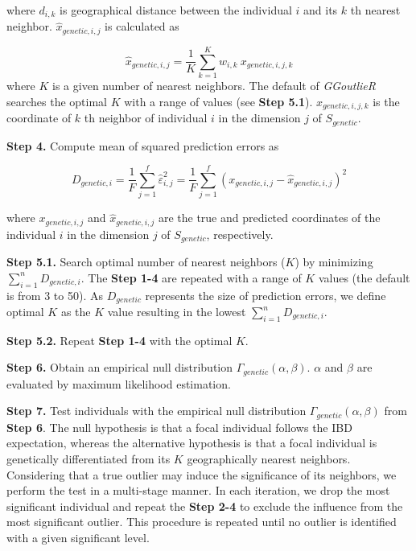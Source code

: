 \documentclass[11pt]{article}
\begin{document}
where $d_{i,k}$ is geographical distance between the individual $i$ and its $k$ th nearest neighbor.
$\hat{x}_{genetic,i,j}$ is calculated as

\begin{equation} \label{wknn_eq1}
\hat{x}_{genetic,i,j}=\frac{1}{K}\sum_{k=1}^{K}w_{i,k}\ x_{genetic,i,j,k}
\end{equation}
where $K$ is a given number of nearest neighbors. 
The default of \textit{GGoutlieR} searches the optimal $K$ with a range of values (see \textbf{Step 5.1}).
$x_{genetic,i,j,k}$ is the coordinate of $k$ th neighbor of individual $i$ in the dimension $j$ of $S_{genetic}$.

\textbf{Step 4.} Compute mean of squared prediction errors as

\begin{equation} \label{Dg_eq}
D_{genetic, i}=\frac{1}{F}\sum_{j=1}^{f} \hat{\varepsilon}_{i,j}^2 =\frac{1}{F}\sum_{j=1}^{f} (x_{genetic,i,j} - \hat{x}_{genetic,i,j})^2
\end{equation}

where $x_{genetic,i,j}$ and $\hat{x}_{genetic,i,j}$ are the true and predicted coordinates of the individual $i$ in the dimension $j$ of $S_{genetic}$, respectively.

\textbf{Step 5.1.} Search optimal number of nearest neighbors ($K$) by minimizing $\sum_{i=1}^{n}D_{genetic,i}$. 
The \textbf{Step 1-4} are repeated with a range of $K$ values (the default is from 3 to 50).
As $D_{genetic}$ represents the size of prediction errors, we define optimal $K$ as the $K$ value resulting in the lowest $\sum_{i=1}^{n}D_{genetic,i}$.


\textbf{Step 5.2.} Repeat \textbf{Step 1-4} with the optimal $K$.

\textbf{Step 6.} Obtain an empirical null distribution $\Gamma_{genetic}(\alpha,\beta)$. $\alpha$ and $\beta$ are evaluated by maximum likelihood estimation.

\textbf{Step 7.} Test individuals with the empirical null distribution $\Gamma_{genetic}(\alpha,\beta)$ from \textbf{Step 6}. The null hypothesis is that a focal individual follows the IBD expectation, whereas the alternative hypothesis is that a focal individual is genetically differentiated from its $K$ geographically nearest neighbors.
Considering that a true outlier may induce the significance of its neighbors, we perform the test in a multi-stage manner.
In each iteration, we drop the most significant individual and repeat the \textbf{Step 2-4} to exclude the influence from the most significant outlier.
This procedure is repeated until no outlier is identified with a given significant level.
\end{document}
